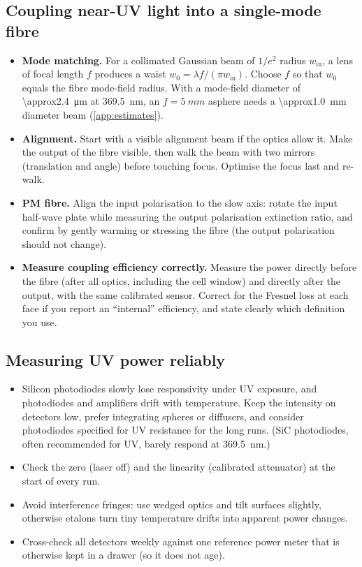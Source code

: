 \subsection{Coupling near-UV light into a single-mode fibre}
\begin{itemize}
  \item \textbf{Mode matching.} For a collimated Gaussian beam of $1/e^2$ radius $w_\text{in}$, a lens of
        focal length $f$ produces a waist $w_0=\lambda f/(\pi w_\text{in})$. Choose $f$ so that $w_0$
        equals the fibre mode-field radius. With a mode-field diameter of \SI{\approx2.4}{\micro m} at
        \SI{369.5}{nm}, an $f=\SI{5}{mm}$ asphere needs a \SI{\approx1.0}{mm} diameter beam
        (\cref{app:estimates}).
  \item \textbf{Alignment.} Start with a visible alignment beam if the optics allow it. Make the
        output of the fibre visible, then walk the beam with two mirrors (translation and angle) before
        touching focus. Optimise the focus last and re-walk.
  \item \textbf{PM fibre.} Align the input polarisation to the slow axis: rotate the input half-wave
        plate while measuring the output polarisation extinction ratio, and confirm by gently warming or
        stressing the fibre (the output polarisation should not change).
  \item \textbf{Measure coupling efficiency correctly.} Measure the power directly before the fibre
        (after all optics, including the cell window) and directly after the output, with the same
        calibrated sensor. Correct for the Fresnel loss at each face if you report an ``internal''
        efficiency, and state clearly which definition you use.
\end{itemize}

\subsection{Measuring UV power reliably}
\begin{itemize}
  \item Silicon photodiodes slowly lose responsivity under UV exposure, and photodiodes and amplifiers
        drift with temperature. Keep the intensity on detectors low, prefer integrating spheres or
        diffusers, and consider photodiodes specified for UV resistance for the long runs. (SiC photodiodes,
        often recommended for UV, barely respond at \SI{369.5}{nm}.)
  \item Check the zero (laser off) and the linearity (calibrated attenuator) at the start of every run.
  \item Avoid interference fringes: use wedged optics and tilt surfaces slightly, otherwise
        etalons turn tiny temperature drifts into apparent power changes.
  \item Cross-check all detectors weekly against one reference power meter that is otherwise kept in a
        drawer (so it does not age).
\end{itemize}

